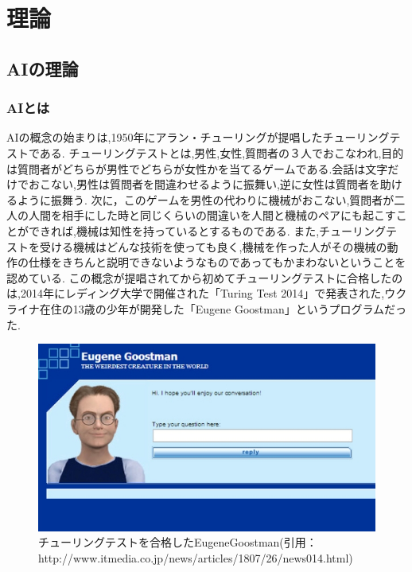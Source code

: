 \chapter{理論}
\section{AIの理論}
\subsection{AIとは}
AIの概念の始まりは,1950年にアラン・チューリングが提唱したチューリングテストである.\cite{ronbun1}
チューリングテストとは,男性,女性,質問者の３人でおこなわれ,目的は質問者がどちらが男性でどちらが女性かを当てるゲームである.会話は文字だけでおこない,男性は質問者を間違わせるように振舞い,逆に女性は質問者を助けるように振舞う.
次に，このゲームを男性の代わりに機械がおこない,質問者が二人の人間を相手にした時と同じくらいの間違いを人間と機械のペアにも起こすことができれば,機械は知性を持っているとするものである.
また,チューリングテストを受ける機械はどんな技術を使っても良く,機械を作った人がその機械の動作の仕様をきちんと説明できないようなものであってもかまわないということを認めている.
この概念が提唱されてから初めてチューリングテストに合格したのは,2014年にレディング大学で開催された「Turing Test 2014」で発表された,ウクライナ在住の13歳の少年が開発した「Eugene Goostman」というプログラムだった.\\
\begin{figure}[!ht]
    \begin{screen}
    \begin{center}
        \includegraphics[scale=0.6, clip]{./img/Eugene_Goostman.jpg}
        \caption{チューリングテストを合格したEugeneGoostman\newline(引用：http://www.itmedia.co.jp/news/articles/1807/26/news014.html)}
        \label{fig:チューリングテストを合格したEugeneGoostman}
    \end{center}
\end{screen}
\end{figure}

